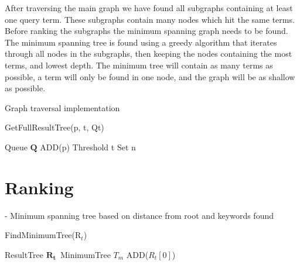 After traversing the main graph we have found all subgraphs containing at least one query term. These subgraphs contain many nodes which hit the same terms. Before ranking the subgraphs the minimum spanning graph needs to be found. The minimum spanning tree is found using a greedy algorithm that iterates through all nodes in the subgraphs, then keeping the nodes containing the most terms, and lowest depth. The minimum tree will contain as many terms as possible, a term will only be found in one node, and the graph will be as shallow as possible.


Graph traversal implementation

\begin{algorithm}[H]
    \caption{GetFullResultTree(p, t, Qt)}
    \SetAlgoLined
    Queue $\mathbf{Q}$ ADD(p)\; Threshold t\; Set n \;
\end{algorithm}



\section{Ranking}
- Minimum spanning tree based on distance from root and keywords found

\begin{algorithm}
    \caption{FindMinimumTree(R$_t$)}
    \SetAlgoLined
    ResultTree $\mathbf{R_t}$\ MinimumTree $T_m$ ADD($R_t[0]$)\;
\end{algorithm}

